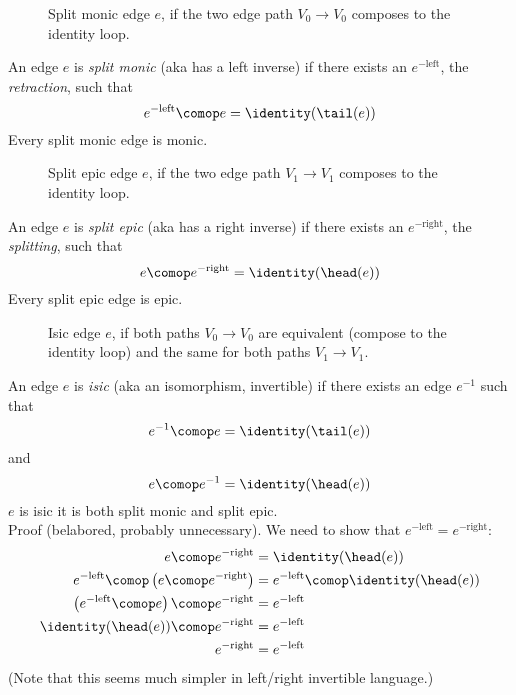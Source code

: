 \documentclass[11pt,openany]{book}
\begin{document}
\begin{figure}
\centering
{}
\caption{Split monic edge $e$, if the two edge path
$V_0 \longrightarrow V_0$
composes to the identity loop.}
\label{fig:split_monic}
\end{figure}

An edge $e$ is \textit{split monic} (aka has a left inverse)
if there exists an $e^{-\text{left}}$, the \textit{retraction},
such that
\[
e^{-\text{left}} \comop e = \identity(\tail(e))
\]
Every split monic edge is monic.

\begin{figure}
\centering
{}
\caption{Split epic edge $e$, if the two edge path
$V_1 \longrightarrow V_1$
composes to the identity loop.}
\label{fig:split_epic}
\end{figure}

An edge $e$ is \textit{split epic} (aka has a right inverse)
if there exists an $e^{-\text{right}}$, the \textit{splitting}, 
such that
\[
e \comop e^{-\text{right}} = \identity(\head(e))
\]
Every split epic edge is epic.

\begin{figure}
\centering
{}
\caption{Isic edge $e$, if both paths $V_0 \longrightarrow V_0$
are equivalent (compose to the identity loop) and the 
same for both paths $V_1 \longrightarrow V_1$.}
\label{fig:isic}
\end{figure}

An edge $e$ is \textit{isic} (aka an isomorphism, invertible)
if there exists an edge $e^{-1}$ such that
\[
e^{-1} \comop e = \identity(\tail(e))
\]
and
\[
e \comop e^{-1} = \identity(\head(e))
\]
$e$ is isic \liff it is both split monic and split epic.\\
Proof (belabored, probably unnecessary).
We need to show that $e^{-\text{left}} = e^{-\text{right}}$:
\begin{align*}
e \comop e^{-\text{right}} 
& = 
\identity(\head(e)) 
\\
e^{-\text{left}} \comop \left( e \comop e^{-\text{right}} \right)
& = 
e^{-\text{left}} \comop \identity(\head(e)) 
\\
\left( e^{-\text{left}} \comop e \right) \comop e^{-\text{right}} 
& = 
e^{-\text{left}}
\\
\identity(\head(e)) \comop e^{-\text{right}} 
& = 
e^{-\text{left}} 
\\
e^{-\text{right}} 
& = 
e^{-\text{left}} 
\end{align*}
(Note that this seems much simpler in left/right invertible language.)
\end{document}
